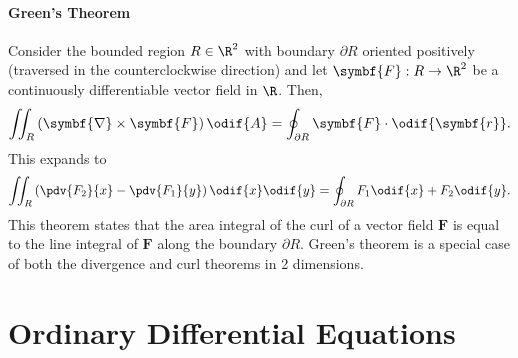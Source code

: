 \documentclass{article}
\begin{document}
\subsection{Green's Theorem}
Consider the bounded region \(R \in \R^2\) with boundary \(\partial R\)
oriented positively (traversed in the counterclockwise direction) and
let \(\symbf{F}:R \to \R^2\) be a continuously differentiable vector
field in \(\R\). Then,
\begin{equation*}
    \iint_R \left( \symbf{\nabla} \times \symbf{F} \right) \odif{A} = \oint_{\partial R} \symbf{F} \cdot \odif{\symbf{r}}.
\end{equation*}
This expands to
\begin{equation*}
    \iint_R \left( \pdv{F_2}{x} - \pdv{F_1}{y} \right) \odif{x} \odif{y} = \oint_{\partial R} F_1 \odif{x} + F_2 \odif{y}.
\end{equation*}
This theorem states that the area integral of the curl of a vector field
\(\symbf{F}\) is equal to the line integral of \(\symbf{F}\) along the
boundary \(\partial R\). Green's theorem is a special case of both the
divergence and curl theorems in 2 dimensions.
\newpage
\part{Ordinary Differential Equations}
\end{document}
